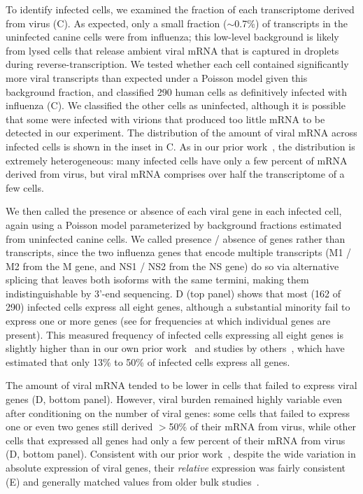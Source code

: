 \documentclass[9pt,lineno]{elife}
\begin{document}
To identify infected cells, we examined the fraction of each transcriptome derived from virus (C).
As expected, only a small fraction ($\sim$0.7\%) of transcripts in the uninfected canine cells were from influenza; this low-level background is likely from lysed cells that release ambient viral mRNA that is captured in droplets during reverse-transcription.
We tested whether each cell contained significantly more viral transcripts than expected under a Poisson model given this background fraction, and classified 290 human cells as definitively infected with influenza (C).
We classified the other cells as uninfected, although it is possible that some were infected with virions that produced too little mRNA to be detected in our experiment.
The distribution of the amount of viral mRNA across infected cells is shown in the inset in C.
As in our prior work~\citep{russell2018extreme}, the distribution is extremely heterogeneous: many infected cells have only a few percent of mRNA derived from virus, but viral mRNA comprises over half the transcriptome of a few cells.

We then called the presence or absence of each viral gene in each infected cell, again using a Poisson model parameterized by background fractions estimated from uninfected canine cells.
We called presence / absence of genes rather than transcripts, since the two influenza genes that encode multiple transcripts (M1 / M2 from the M gene, and NS1 / NS2 from the NS gene) do so via alternative splicing that leaves both isoforms with the same termini, making them indistinguishable by 3'-end sequencing.
D (top panel) shows that most (162 of 290) infected cells express all eight genes, although a substantial minority fail to express one or more genes (see  for frequencies at which individual genes are present).
This measured frequency of infected cells expressing all eight genes is slightly higher than in our own prior work~\citep{russell2018extreme} and studies by others~\citep{brooke2013most, heldt2015single, dou2017analysis}, which have estimated that only 13\% to 50\% of infected cells express all genes. 

The amount of viral mRNA tended to be lower in cells that failed to express viral genes (D, bottom panel).
However, viral burden remained highly variable even after conditioning on the number of viral genes: some cells that failed to express one or even two genes still derived $>$50\% of their mRNA from virus, while other cells that expressed all genes had only a few percent of their mRNA from virus (D, bottom panel).
Consistent with our prior work~\citep{russell2018extreme}, despite the wide variation in absolute expression of viral genes, their \emph{relative} expression was fairly consistent (E) and generally matched values from older bulk studies~\citep{hatada1989control}.
\end{document}
